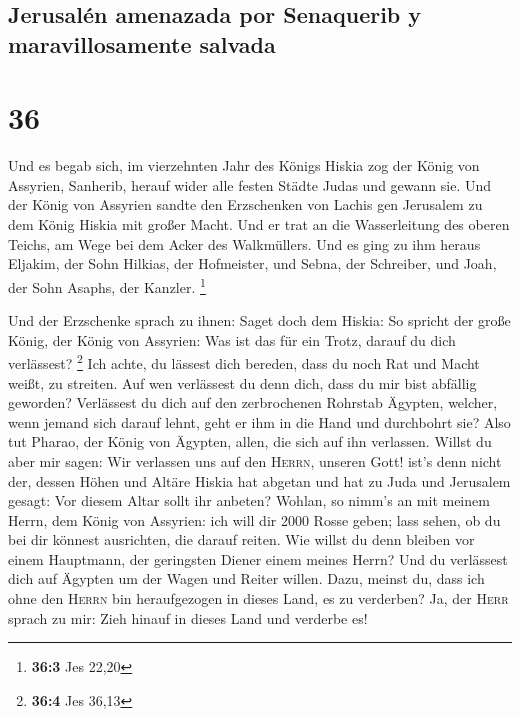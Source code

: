 \hypertarget{jerusaluxe9n-amenazada-por-senaquerib-y-maravillosamente-salvada}{%
\subsection{Jerusalén amenazada por Senaquerib y maravillosamente
salvada}\label{jerusaluxe9n-amenazada-por-senaquerib-y-maravillosamente-salvada}}

\hypertarget{section-35}{%
\section{36}\label{section-35}}

 Und es begab sich, im vierzehnten Jahr des Königs Hiskia
zog der König von Assyrien, Sanherib, herauf wider alle festen Städte
Judas und gewann sie.  Und der König von Assyrien sandte
den Erzschenken von Lachis gen Jerusalem zu dem König Hiskia mit großer
Macht. Und er trat an die Wasserleitung des oberen Teichs, am Wege bei
dem Acker des Walkmüllers.  Und es ging zu ihm heraus
Eljakim, der Sohn Hilkias, der Hofmeister, und Sebna, der Schreiber, und
Joah, der Sohn Asaphs, der Kanzler. \footnote{\textbf{36:3} Jes 22,20}

 Und der Erzschenke sprach zu ihnen: Saget doch dem
Hiskia: So spricht der große König, der König von Assyrien: Was ist das
für ein Trotz, darauf du dich verlässest? \footnote{\textbf{36:4} Jes
  36,13}  Ich achte, du lässest dich bereden, dass du noch
Rat und Macht weißt, zu streiten. Auf wen verlässest du denn dich, dass
du mir bist abfällig geworden?  Verlässest du dich auf den
zerbrochenen Rohrstab Ägypten, welcher, wenn jemand sich darauf lehnt,
geht er ihm in die Hand und durchbohrt sie? Also tut Pharao, der König
von Ägypten, allen, die sich auf ihn verlassen.  Willst du
aber mir sagen: Wir verlassen uns auf den \textsc{Herrn}, unseren Gott!
ist's denn nicht der, dessen Höhen und Altäre Hiskia hat abgetan und hat
zu Juda und Jerusalem gesagt: Vor diesem Altar sollt ihr anbeten?
 Wohlan, so nimm's an mit meinem Herrn, dem König von
Assyrien: ich will dir 2000 Rosse geben; lass sehen, ob du bei dir
könnest ausrichten, die darauf reiten.  Wie willst du denn
bleiben vor einem Hauptmann, der geringsten Diener einem meines Herrn?
Und du verlässest dich auf Ägypten um der Wagen und Reiter willen.
 Dazu, meinst du, dass ich ohne den \textsc{Herrn} bin
heraufgezogen in dieses Land, es zu verderben? Ja, der \textsc{Herr}
sprach zu mir: Zieh hinauf in dieses Land und verderbe es!

